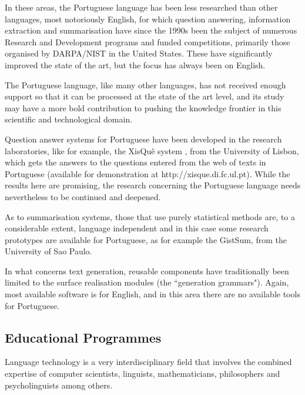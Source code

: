 \begin{multicols}{2}
In these areas, the Portuguese language has been less researched than other languages, most notoriously English, 
for which question answering, information extraction and summarisation have since the 1990s been the subject of numerous 
Research and Development programs and funded competitions, 
primarily those organised by DARPA/NIST in the United States. 
These have significantly improved the state of the art, but the focus has always been on English.

The Portuguese language, like many other languages, has not received enough support
so that it can be processed at the state of the art level, and its study may
have a more bold contribution to pushing the knowledge frontier in this scientific and technological 
domain.


Question answer systems for Portuguese have been developed in the research laboratories,
like for example, the XisQuê system \cite{xisque}, from the University of Lisbon, which gets the answers
to the questions entered from the web of texts in Portuguese (available for demonstration
at http://xisque.di.fc.ul.pt). While the results here are promising, the research
concerning the Portuguese language needs nevertheless to be continued and deepened.

As to summarisation systems, those that use purely statistical methods are, to a considerable extent, language independent 
and in this case some research prototypes are available for Portuguese, as for example the GistSum,
from the University of Sao Paulo.

In what concerns text generation, reusable components have traditionally been limited to the surface realisation 
modules (the “generation grammars"). Again, most available software is for English, and in this area there are 
no available tools for Portuguese. 


\subsection{Educational Programmes}

 Language technology is a very interdisciplinary field that involves the combined expertise of computer scientists, linguists, mathematicians, philosophers
and psycholinguists among others. 


\end{multicols}
